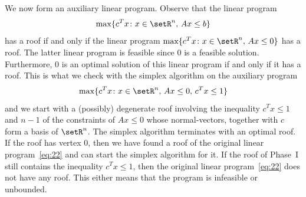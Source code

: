   We now form an auxiliary linear program. Observe that the linear
  program 
  \begin{equation}
    \label{eq:22}
    \max\{c^Tx \colon x \in \setR^n, \, Ax\leq b\}
  \end{equation}
  has a roof if and only  
  if the linear program $\max\{c^Tx \colon x \in \setR^n, \,Ax\leq0\}$ has a
  roof.  The latter linear program is feasible since $0$ is a feasible
  solution. Furthermore, $0$ is an optimal solution of this linear
  program if and only if it has a roof. This is what we check with the
  simplex algorithm on the auxiliary program 
  \begin{equation}
    \label{eq:14}
    \max\{c^T x \colon x \in \setR^n, \, Ax\leq0, \, c^Tx \leq 1\}
  \end{equation}
  and we start with a (possibly) degenerate roof involving the
  inequality $c^Tx\leq1$ and $n-1$ of the constraints of $Ax\leq0$ whose
  normal-vectors, together with $c$ form a basis of $\setR^n$. The
  simplex algorithm terminates with an optimal roof. If the roof has
  vertex $0$, then we have found a roof of the original linear
  program~\eqref{eq:22} and can start the simplex algorithm for it. If
  the roof of Phase~I still contains the inequality $c^Tx\leq1$, then
  the original linear program~\eqref{eq:22} does not have any
  roof. This either means that the program is infeasible or
  unbounded. 
  



